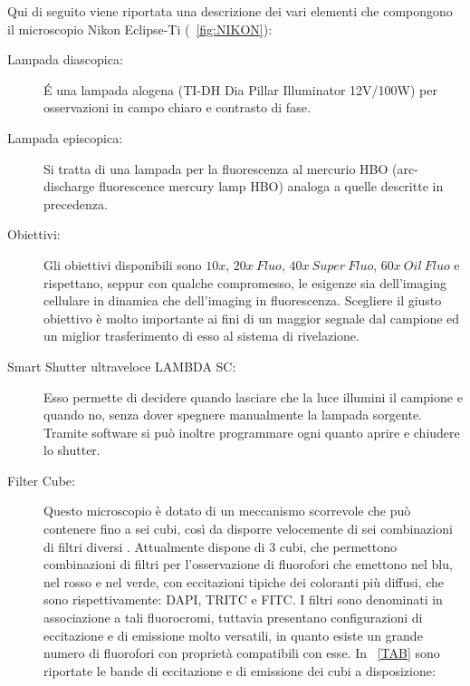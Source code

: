 Qui di seguito viene riportata una descrizione dei vari elementi che compongono il microscopio Nikon Eclipse-Ti (\figurename~\ref{fig:NIKON}):

\begin{description}

\item[Lampada diascopica:]
\'E una lampada alogena (TI-DH Dia Pillar Illuminator 12V/100W) per osservazioni in campo chiaro e contrasto di fase.

\item[Lampada episcopica:]
Si tratta di una lampada per la fluorescenza al mercurio HBO (arc-discharge fluorescence mercury lamp HBO) analoga a quelle descritte in precedenza.

\item[Obiettivi:]
Gli obiettivi disponibili sono $10x$, $20x\ Fluo$, $40x\ Super\ Fluo$, $60x\ Oil\ Fluo$ e rispettano, seppur con qualche compromesso, le esigenze sia dell'imaging cellulare in dinamica che dell'imaging in fluorescenza. 
Scegliere il giusto obiettivo è molto importante ai fini di un maggior segnale dal campione ed un miglior trasferimento di esso al sistema di rivelazione.

\item[Smart Shutter ultraveloce LAMBDA SC:]
Esso permette di decidere quando lasciare che la luce illumini il campione e quando no, senza dover spegnere manualmente la lampada sorgente.
Tramite software si può inoltre programmare ogni quanto aprire e chiudere lo shutter.

\item[Filter Cube:]
Questo microscopio è dotato di un meccanismo scorrevole che può contenere fino a sei cubi, così da disporre velocemente di sei combinazioni di filtri diversi \cite{Nikon1}. 
Attualmente dispone di 3 cubi, che permettono combinazioni di filtri per l'osservazione di fluorofori che emettono nel blu, nel rosso e nel verde, con eccitazioni tipiche dei coloranti più diffusi, che sono rispettivamente: DAPI, TRITC e FITC. 
I filtri sono denominati in associazione a tali fluorocromi, tuttavia presentano configurazioni di eccitazione e di emissione molto versatili, in quanto esiste un grande numero di fluorofori con proprietà compatibili con esse. 
In \tablename~\ref{TAB} sono riportate le bande di eccitazione e di emissione dei cubi a disposizione:


\end{description}
